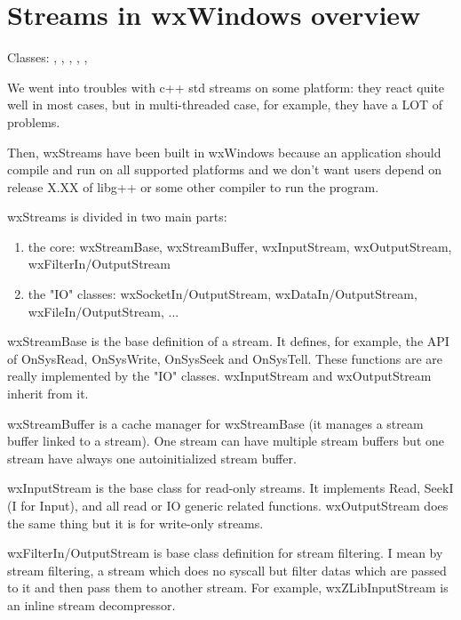 \section{Streams in wxWindows overview}\label{wxstreamoverview}

Classes: ,
 , ,
 ,
 ,


We went into troubles with c++ std streams on some platform:
they react quite well in most cases, but in multi-threaded case, for example,
they have a LOT of problems.

Then, wxStreams have been built in wxWindows because an application should compile
and run on all supported platforms and we don't want users depend on release
X.XX of libg++ or some other compiler to run the program.

wxStreams is divided in two main parts:
\begin{enumerate}\itemsep=0pt
\item the core: wxStreamBase, wxStreamBuffer, wxInputStream, wxOutputStream,
wxFilterIn/OutputStream
\item the "IO" classes: wxSocketIn/OutputStream, wxDataIn/OutputStream, wxFileIn/OutputStream, ...
\end{enumerate}

wxStreamBase is the base definition of a stream. It defines, for example,
the API of OnSysRead, OnSysWrite, OnSysSeek and OnSysTell. These functions are
are really implemented by the "IO" classes.
wxInputStream and wxOutputStream inherit from it.

wxStreamBuffer is a cache manager for wxStreamBase (it manages a stream buffer
linked to a stream). One stream can have multiple stream buffers  but one stream
have always one autoinitialized stream buffer.

wxInputStream is the base class for read-only streams. It implements Read,
SeekI (I for Input), and all read or IO generic related functions.
wxOutputStream does the same thing but it is for write-only streams.

wxFilterIn/OutputStream is base class definition for stream filtering.
I mean by stream filtering, a stream which does no syscall but filter datas
which are passed to it and then pass them to another stream.
For example, wxZLibInputStream is an inline stream decompressor.

